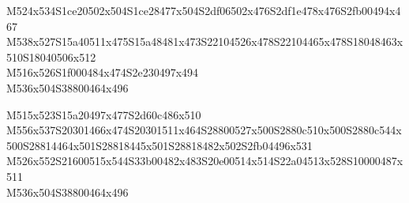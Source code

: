 \documentclass{article}
\begin{document}
\begin{multicols}{5}
\begin{center}
M524x534S1ce20502x504S1ce28477x504S2df06502x476S2df1e478x476S2fb00494x467 %
\\M538x527S15a40511x475S15a48481x473S22104526x478S22104465x478S18048463x510S18040506x512 %
\\M516x526S1f000484x474S2e230497x494 %
\\M536x504S38800464x496 %

M515x523S15a20497x477S2d60c486x510 %
\\M556x537S20301466x474S20301511x464S28800527x500S2880c510x500S2880c544x500S28814464x501S28818445x501S28818482x502S2fb04496x531 %
\\M526x552S21600515x544S33b00482x483S20e00514x514S22a04513x528S10000487x511 %
\\M536x504S38800464x496 %

\end{center}
\end{multicols}
\end{document}

